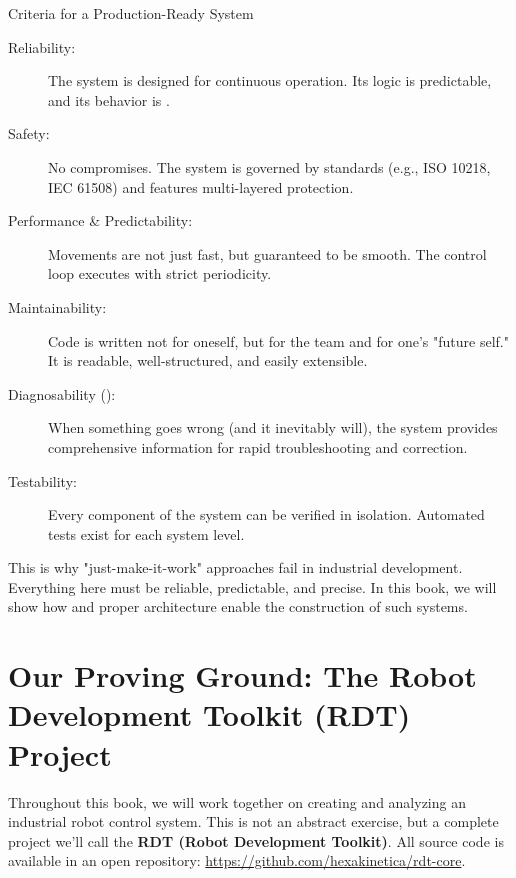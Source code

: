 \begin{principlebox}{Criteria for a Production-Ready System}
    \begin{description}
        \item[Reliability:] The system is designed for continuous operation. Its logic is predictable, and its behavior is .
        
        \item[Safety:] No compromises. The system is governed by standards (e.g., ISO 10218, IEC 61508) and features multi-layered protection.
        
        \item[Performance \& Predictability:] Movements are not just fast, but guaranteed to be smooth. The control loop executes with strict periodicity.
        
        \item[Maintainability:] Code is written not for oneself, but for the team and for one's "future self." It is readable, well-structured, and easily extensible.
        
        \item[Diagnosability ():] When something goes wrong (and it inevitably will), the system provides comprehensive information for rapid troubleshooting and correction.
        
        \item[Testability:] Every component of the system can be verified in isolation. Automated tests exist for each system level.
    \end{description}
\end{principlebox}

This is why "just-make-it-work" approaches fail in industrial development. Everything here must be reliable, predictable, and precise. In this book, we will show how  and proper architecture enable the construction of such systems.

\section{Our Proving Ground: The Robot Development Toolkit (RDT) Project}

Throughout this book, we will work together on creating and analyzing an industrial robot control system. This is not an abstract exercise, but a complete project we'll call the \textbf{RDT (Robot Development Toolkit)}. All source code is available in an open repository: \url{https://github.com/hexakinetica/rdt-core}.

